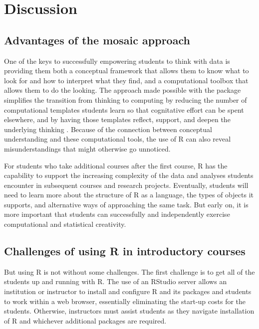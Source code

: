 \section{Discussion}\label{discussion}

\subsection{Advantages of the mosaic
approach}\label{advantages-of-the-mosaic-approach}

One of the keys to successfully empowering students to think with data
is providing them both a conceptual framework that allows them to know
what to look for and how to interpret what they find, and a
computational toolbox that allows them to do the looking. The approach
made possible with the  package simplifies the transition
from thinking to computing by reducing the number of computational
templates students learn so that cognitative effort can be spent
elsewhere, and by having those templates reflect, support, and deepen
the underlying thinking \citep{Grolemund:ISR:2014}. Because of the
connection between conceptual understanding and these computational
tools, the use of R can also reveal misunderstandings that might
otherwise go unnoticed.

For students who take additional courses after the first course, R has
the capability to support the increasing complexity of the data and
analyses students encounter in subsequent courses and research projects.
Eventually, students will need to learn more about the structure of R as
a language, the types of objects it supports, and alternative ways of
approaching the same task. But early on, it is more important that
students can successfully and independently exercise computational and
statistical creativity.

\subsection{Challenges of using R in introductory
courses}\label{challenges-of-using-r-in-introductory-courses}

But using R is not without some challenges. The first challenge is to
get all of the students up and running with R. The use of an RStudio
server allows an institution or instructor to install and configure R
and its packages and students to work within a web browser, essentially
eliminating the start-up costs for the students. Otherwise, instructors
must assist students as they navigate installation of R and whichever
additional packages are required.

